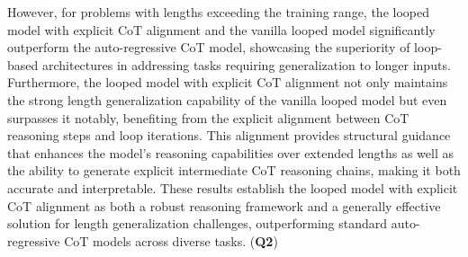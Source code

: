 However, for problems with lengths exceeding the training range, the looped model with explicit CoT alignment and the vanilla looped model significantly outperform the auto-regressive CoT model, showcasing the superiority of loop-based architectures in addressing tasks requiring generalization to longer inputs. 
Furthermore, the looped model with explicit CoT alignment not only maintains the strong length generalization capability of the vanilla looped model but even surpasses it notably, benefiting from the explicit alignment between CoT reasoning steps and loop iterations. This alignment provides structural guidance that enhances the model's reasoning capabilities over extended lengths as well as the ability to generate explicit intermediate CoT reasoning chains, making it both accurate and interpretable. 
These results establish the looped model with explicit CoT alignment as both a robust reasoning framework and a generally effective solution for length generalization challenges, outperforming standard auto-regressive CoT models across diverse tasks. (\textbf{Q2})


